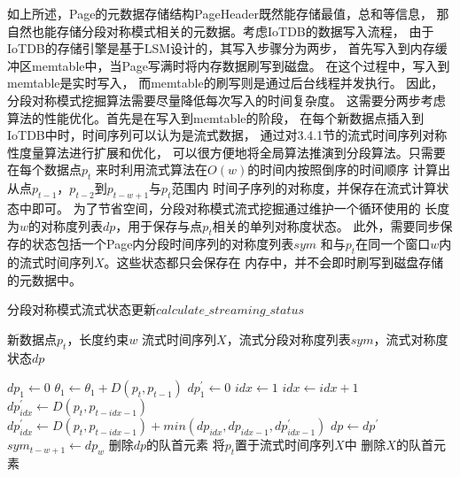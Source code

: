 如上所述，Page的元数据存储结构PageHeader既然能存储最值，总和等信息，
那自然也能存储分段对称模式相关的元数据。考虑IoTDB的数据写入流程，
由于IoTDB的存储引擎是基于LSM\cite{DBLP:journals/vldb/LuoC20}设计的，其写入步骤分为两步，
首先写入到内存缓冲区memtable中，当Page写满时将内存数据刷写到磁盘。
在这个过程中，写入到memtable是实时写入，
而memtable的刷写则是通过后台线程并发执行。
因此，分段对称模式挖掘算法需要尽量降低每次写入的时间复杂度。
这需要分两步考虑算法的性能优化。首先是在写入到memtable的阶段，
在每个新数据点插入到IoTDB中时，时间序列可以认为是流式数据，
通过对3.4.1节的流式时间序列对称性度量算法进行扩展和优化，
可以很方便地将全局算法推演到分段算法。只需要在每个数据点$p_t$
来时利用流式算法在$O(w)$的时间内按照倒序的时间顺序
计算出从点$p_{t-1}$，$p_{t-2}$到$p_{t-w+1}$与$p_t$范围内
时间子序列的对称度，并保存在流式计算状态中即可。
为了节省空间，分段对称模式流式挖掘通过维护一个循环使用的
长度为$w$的对称度列表$dp$，用于保存与点$p_t$相关的单列对称度状态。
此外，需要同步保存的状态包括一个Page内分段时间序列的对称度列表$sym$
和与$p_t$在同一个窗口$w$内的流式时间序列$X$。这些状态都只会保存在
内存中，并不会即时刷写到磁盘存储的元数据中。

\renewcommand{\algorithmicrequire}{\textbf{输入：}\unskip}
\renewcommand{\algorithmicensure}{\textbf{输出：}\unskip}

\begin{algorithm}
  \caption{分段对称模式流式状态更新$calculate\_streaming\_status$}
  \label{alg:iotdb_streaming}
  \small
  \begin{algorithmic}
    \REQUIRE 新数据点$p_t$，长度约束$w$
    \ENSURE 流式时间序列$X$，流式分段对称度列表$sym$，流式对称度状态$dp$

        \STATE $dp_{1} \leftarrow 0$
    \ELSE
      \STATE $\theta_1 \leftarrow \theta_1 + D\left(p_{t}, p_{t-1}\right)$
      \STATE $dp_1^{\prime} \leftarrow 0$
      \STATE $ idx \leftarrow 1$
        \STATE $ idx \leftarrow idx+1$
          \STATE $dp_{idx}^{\prime} \leftarrow D\left(p_{t}, p_{t-idx-1}\right)$
        \ELSE
          \STATE $dp_{idx}^{\prime} \leftarrow D\left(p_{t}, p_{t-idx-1}\right)+min(dp_{idx},dp_{idx-1},dp_{idx-1}^{\prime})$
        \ENDIF
      \ENDWHILE
      \STATE $ dp \leftarrow dp^{\prime}$
        \STATE $sym_{t-w+1} \leftarrow dp_{w}$
        \STATE 删除$dp$的队首元素
      \ENDIF
    \ENDIF
    \STATE 将$p_t$置于流式时间序列$X$中
      \STATE 删除$X$的队首元素
    \ENDIF
  \end{algorithmic}
\end{algorithm}

